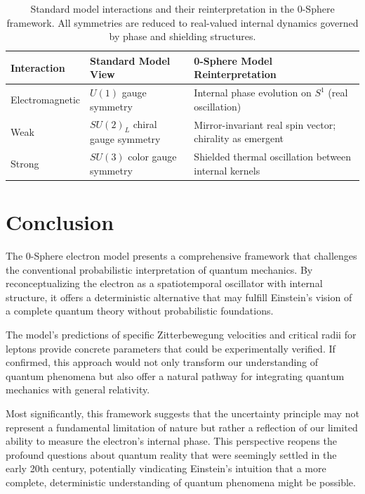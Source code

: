 \documentclass[12pt,letterpaper]{article} %
\begin{document}
\begin{table}[t!]
\centering
\caption{Standard model interactions and their reinterpretation in the 0-Sphere framework. All symmetries are reduced to real-valued internal dynamics governed by phase and shielding structures.}
\label{tab:gauge-summary}
\renewcommand{\arraystretch}{1.4}
\begin{tabular}{p{3.8cm}p{5.5cm}p{5.5cm}}
\toprule
\textbf{Interaction} & \textbf{Standard Model View} & \textbf{0-Sphere Model Reinterpretation} \\
\midrule
Electromagnetic & $U(1)$ gauge symmetry & Internal phase evolution on $S^1$ (real oscillation) \\
\addlinespace[0.3cm]
Weak & $SU(2)_L$ chiral gauge symmetry & Mirror-invariant real spin vector; chirality as emergent \\
\addlinespace[0.3cm]
Strong & $SU(3)$ color gauge symmetry & Shielded thermal oscillation between internal kernels \\
\bottomrule
\end{tabular}
\end{table}


\section{Conclusion}

The 0-Sphere electron model presents a comprehensive framework that challenges the conventional probabilistic interpretation of quantum mechanics. By reconceptualizing the electron as a spatiotemporal oscillator with internal structure, it offers a deterministic alternative that may fulfill Einstein's vision of a complete quantum theory without probabilistic foundations\cite{einstein1935}.

The model's predictions of specific Zitterbewegung velocities and critical radii for leptons provide concrete parameters that could be experimentally verified. If confirmed, this approach would not only transform our understanding of quantum phenomena but also offer a natural pathway for integrating quantum mechanics with general relativity.

Most significantly, this framework suggests that the uncertainty principle may not represent a fundamental limitation of nature but rather a reflection of our limited ability to measure the electron's internal phase. This perspective reopens the profound questions about quantum reality that were seemingly settled in the early 20th century, potentially vindicating Einstein's intuition that a more complete, deterministic understanding of quantum phenomena might be possible.
\end{document}

